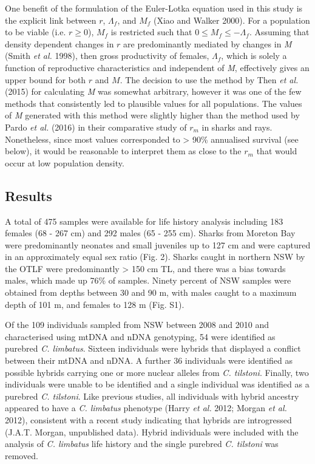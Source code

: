 \documentclass[]{article}
\begin{document}
One benefit of the formulation of the Euler-Lotka equation used in this
study is the explicit link between \(r\), \(\Lambda_f\), and \(M_f\)
(Xiao and Walker 2000). For a population to be viable (i.e.
\(r \geq 0\)), \(M_f\) is restricted such that
\(0 \leq M_f \leq -\Lambda_f\). Assuming that density dependent changes
in \(r\) are predominantly mediated by changes in \emph{M} (Smith
\emph{et al.} 1998), then gross productivity of females, \(\Lambda_f\),
which is solely a function of reproductive characteristics and
independent of \emph{M}, effectively gives an upper bound for both \(r\)
and \(M\). The decision to use the method by Then \emph{et al.} (2015)
for calculating \emph{M} was somewhat arbitrary, however it was one of
the few methods that consistently led to plausible values for all
populations. The values of \emph{M} generated with this method were
slightly higher than the method used by Pardo \emph{et al.} (2016) in
their comparative study of \(r_m\) in sharks and rays. Nonetheless,
since most values corresponded to \textgreater{} 90\% annualised
survival (see below), it would be reasonable to interpret them as close
to the \(r_m\) that would occur at low population density.

\subsection{Results}\label{results}

A total of 475 samples were available for life history analysis
including 183 females (68 - 267 cm) and 292 males (65 - 255 cm). Sharks
from Moreton Bay were predominantly neonates and small juveniles up to
127 cm and were captured in an approximately equal sex ratio (Fig. 2).
Sharks caught in northern NSW by the OTLF were predominantly
\textgreater{} 150 cm TL, and there was a bias towards males, which made
up 76\% of samples. Ninety percent of NSW samples were obtained from
depths between 30 and 90 m, with males caught to a maximum depth of 101
m, and females to 128 m (Fig. S1).

Of the 109 individuals sampled from NSW between 2008 and 2010 and
characterised using mtDNA and nDNA genotyping, 54 were identified as
purebred \emph{C. limbatus}. Sixteen individuals were hybrids that
displayed a conflict between their mtDNA and nDNA. A further 36
individuals were identified as possible hybrids carrying one or more
nuclear alleles from \emph{C. tilstoni}. Finally, two individuals were
unable to be identified and a single individual was identified as a
purebred \emph{C. tilstoni}. Like previous studies, all individuals with
hybrid ancestry appeared to have a \emph{C. limbatus} phenotype (Harry
\emph{et al.} 2012; Morgan \emph{et al.} 2012), consistent with a recent
study indicating that hybrids are introgressed (J.A.T. Morgan,
unpublished data). Hybrid individuals were included with the analysis of
\emph{C. limbatus} life history and the single purebred \emph{C.
tilstoni} was removed.
\end{document}
